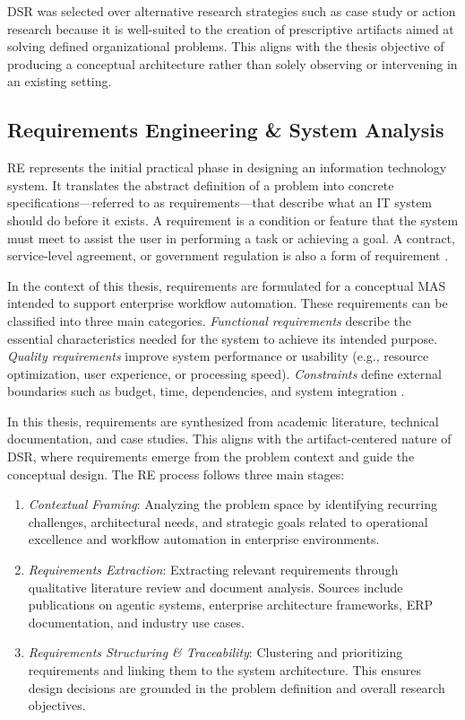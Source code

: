 DSR was selected over alternative research strategies such as case study or action research because it is well-suited to the creation of prescriptive artifacts aimed at solving defined organizational problems. This aligns with the thesis objective of producing a conceptual architecture rather than solely observing or intervening in an existing setting.

\subsection{Requirements Engineering \& System Analysis}
\label{subsec:requirements}
RE represents the initial practical phase in designing an information technology system. It translates the abstract definition of a problem into concrete specifications—referred to as requirements—that describe what an IT system should do before it exists. A requirement is a condition or feature that the system must meet to assist the user in performing a task or achieving a goal. A contract, service-level agreement, or government regulation is also a form of requirement \parencite[cf.][p. 62]{IEEEStandardGlossary1991}.

In the context of this thesis, requirements are formulated for a conceptual MAS intended to support enterprise workflow automation. These requirements can be classified into three main categories. \emph{Functional requirements} describe the essential characteristics needed for the system to achieve its intended purpose. \emph{Quality requirements} improve system performance or usability (e.g., resource optimization, user experience, or processing speed). \emph{Constraints} define external boundaries such as budget, time, dependencies, and system integration \parencite[cf.][p. 8]{glinzRequirementEngineering2020}.

In this thesis, requirements are synthesized from academic literature, technical documentation, and case studies. This aligns with the artifact-centered nature of DSR, where requirements emerge from the problem context and guide the conceptual design. The RE process follows three main stages:

\begin{enumerate}
    \item \emph{Contextual Framing}: Analyzing the problem space by identifying recurring challenges, architectural needs, and strategic goals related to operational excellence and workflow automation in enterprise environments.
    \item \emph{Requirements Extraction}: Extracting relevant requirements through qualitative literature review and document analysis. Sources include publications on agentic systems, enterprise architecture frameworks, ERP documentation, and industry use cases.
    \item \emph{Requirements Structuring \& Traceability}: Clustering and prioritizing requirements and linking them to the system architecture. This ensures design decisions are grounded in the problem definition and overall research objectives.
\end{enumerate}

